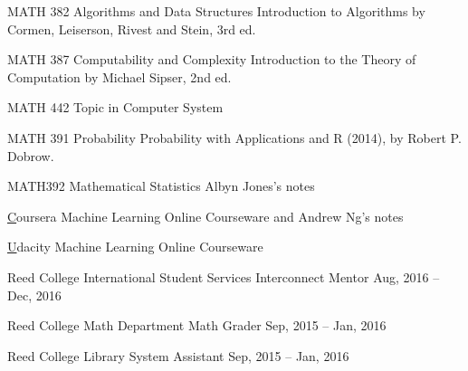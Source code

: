\documentclass[10pt,a4paper]{article}
\begin{document}
   \inlineheadsection
  {MATH 382 Algorithms and Data Structures}
  {Introduction to Algorithms by Cormen, Leiserson, Rivest and Stein, 3rd ed.}
  \vspace{0.5em}
  
   \inlineheadsection
  {MATH 387 Computability and Complexity}
  {Introduction to the Theory of Computation by Michael Sipser, 2nd ed.}
  \vspace{0.5em}
  
   \inlineheadsection
  {MATH 442 Topic in Computer System}
  {}
  \vspace{0.5em}
    
  
   \inlineheadsection
  {MATH 391 Probability}
  {Probability with Applications and R (2014), by Robert P. Dobrow.}
  \vspace{0.5em}
  
   \inlineheadsection
  {MATH392 Mathematical Statistics}
  {Albyn Jones's notes}
  \vspace{0.5em}
  
  
   
   \inlineheadsection
  {\href{https://www.coursera.org/learn/machine-learning}Coursera Machine Learning}
  {Online Courseware and Andrew Ng's notes}
  \vspace{0.5em}
  
   \inlineheadsection
  {\href{https://www.udacity.com/course/intro-to-machine-learning--ud120}Udacity Machine Learning}
  {Online Courseware}
  \vspace{0.5em}


  \spacedhrule{0.5em}{-0.4em}

 \headedsection
  {Reed College International Student Services} {%
  \headedsubsection
    {Interconnect Mentor}
    {Aug, 2016 -- Dec, 2016}
    {}}
  
   \headedsection
  {Reed College Math Department} {%
  \headedsubsection
    {Math Grader}
    {Sep, 2015 -- Jan, 2016}
    {}}

   \headedsection
  {Reed College Library} {%
  \headedsubsection
    {System Assistant}
    {Sep, 2015 -- Jan, 2016}
    {}}
\end{document}
